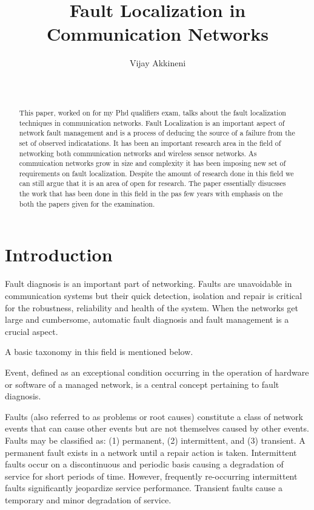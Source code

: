 \documentclass[10pt]{sigplan-proc-varsize}
\author{
%
\alignauthor Vijay Akkineni \\
        \affaddr{Department of Computer Science and Engineering}\\
        \affaddr{Georgia State University}\\
       \email{vakkineni1@student.gsu.edu}
}
\title{Fault Localization in Communication Networks}
\begin{document}
\maketitle

\begin{abstract}
This paper, worked on for my Phd qualifiers exam, talks about the fault localization techniques in communication networks. 
Fault Localization is an important aspect of network fault management and is a process of deducing the source of a failure from the set of observed indicatations. 
It has been an important research area in the field of networking both communication networks and wireless sensor networks.
As commuication networks grow in size and complexity it has been imposing new set of requirements on fault localization. 
Despite the amount of research done in this field we can still argue that it is an area of open for research. 
The paper essentially disucsses the work that has been done in this field in the pas few years with emphasis on the both the papers given for the examination.
\end{abstract}



\section{Introduction}
  \label{sec:intro}

Fault diagnosis is an important part of networking. Faults are unavoidable in communication systems but their quick detection, isolation and repair is critical 
for the robustness, reliability and health of the system. When the networks get large and cumbersome, automatic fault diagnosis and fault management is a crucial aspect.

A basic taxonomy in this field is mentioned below.

Event, defined as an exceptional condition occurring in the operation of hardware or software of a managed network, is a central concept pertaining to fault diagnosis.

Faults (also referred to as problems or root causes) constitute a class of network events that can cause other events but are not themselves caused by other 
events. Faults may be classified as: (1) permanent, (2) intermittent, and (3) transient. A permanent fault exists in a network until a repair action is taken.
Intermittent faults occur on a discontinuous and periodic basis causing a degradation of service for short periods of time.
However, frequently re-occurring intermittent faults significantly jeopardize service performance. 
Transient faults cause a temporary and minor degradation of service.
\end{document}
